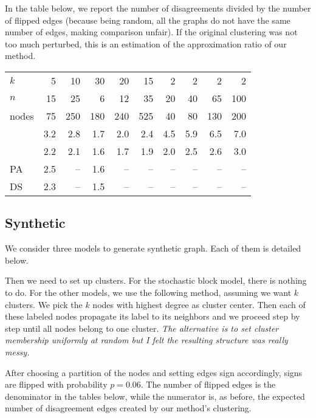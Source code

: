 In the table below, we report the number of disagreements divided by the
number of flipped edges (because being random, all the graphs do not have the
same number of edges, making comparison unfair). If the original clustering
was not too much perturbed, this is an estimation of the approximation ratio
of our method.

\begin{center}
\begin{tabular}{lrrrrrrrrr}
\toprule
$k$      & 5   & 10  & 30  & 20  & 15  & 2   & 2   & 2   & 2  \\
$n$      & 15  & 25  & 6   & 12  & 35  & 20  & 40  & 65  & 100 \\
nodes    & 75  & 250 & 180 & 240 & 525 & 40  & 80  & 130 & 200 \\
\midrule
\pot{}   & 3.2 & 2.8 & 1.7 & 2.0 & 2.4 & 4.5 & 5.9 & 6.5 & 7.0 \\
\pat{}   & 2.2 & 2.1 & 1.6 & 1.7 & 1.9 & 2.0 & 2.5 & 2.6 & 3.0 \\
PA       & 2.5 & --  & 1.6 & --  & --  & --  & --  & --  & -- \\
DS       & 2.3 & --  & 1.5 & --  & --  & --  & --  & --  & -- \\
\bottomrule
\end{tabular}
\end{center}

\subsection{Synthetic}
\label{sub:synthetic}

We consider three models to generate synthetic graph. Each of them is
detailed below.

Then we need to set up clusters. For the stochastic block model, there is
nothing to do. For the other models, we use the following method, assuming
we want $k$ clusters. We pick the $k$ nodes with highest degree as cluster
center. Then each of these labeled nodes propagate its label to its neighbors
and we proceed step by step until all nodes belong to one cluster. \emph{The
alternative is to set cluster membership uniformly at random but I felt the
resulting structure was really messy.}

After choosing a partition of the nodes and setting edges sign accordingly,
signs are flipped with probability $p=0.06$. The number of flipped edges is
the denominator in the tables below, while the numerator is, as before, the
expected number of disagreement edges created by our method's clustering.

